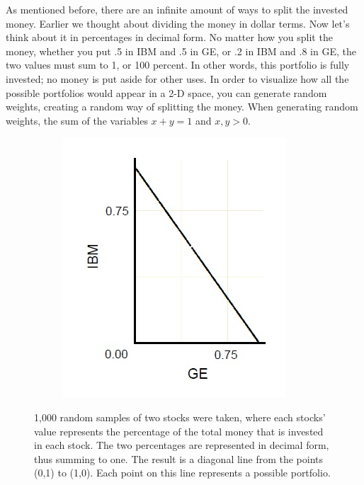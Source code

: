 \documentclass{article}\usepackage{graphicx, color}
\begin{document}
As mentioned before, there are an infinite amount of ways to split the invested money. Earlier we thought about dividing the money in dollar terms. Now let's think about it in percentages in decimal form. No matter how you split the money, whether you put .5 in IBM and .5 in GE, or .2 in IBM and .8 in GE, the two values must sum to 1, or 100 percent. In other words, this portfolio is fully invested; no money is put aside for other uses.
In order to visualize how all the possible portfolios would appear in a 2-D space, you can generate random weights, creating a random way of splitting the money. When generating random weights, the sum of the variables $x + y = 1$ and ${x, y} > 0$.

\begin{figure}[H]
  \begin{subfigure}[b]{0.7\textwidth}
      \centering
      \includegraphics[width=\textwidth]{samples}
      \label{fig:samples}
  \end{subfigure}
\caption{1,000 random samples of two stocks were taken, where each stocks' value represents the percentage of the total money that is invested in each stock. The two percentages are represented in decimal form, thus summing to one. The result is a diagonal line from the points (0,1) to (1,0). Each point on this line represents a possible portfolio.}
\end{figure}
\end{document}
